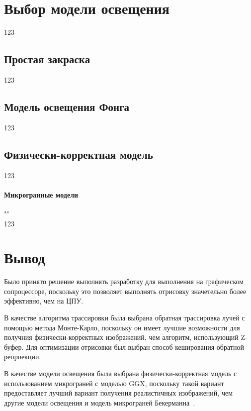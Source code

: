 \section{Выбор модели освещения}

123

\subsection{Простая закраска}
123~\cite{Rodzhers}

\subsection{Модель освещения Фонга}
123~\cite{IFCGP}

\subsection{Физически-корректная модель}
123~\cite{PBRT3e}

\paragraph{Микрогранные модели}""\\
123~\cite{PBRT3e}~\cite{MMfRtRS}

\section{Вывод}

Было принято решение выполнять разработку для выполнения на графическом сопроцессоре,
поскольку это позволяет выполнять отрисовку значетельно более эффективно, чем на ЦПУ.

В качестве алгоритма трассировки была выбрана обратная трассировка лучей с помощью
метода Монте-Карло, поскольку он имеет
лучшие возможности для получния физически-корректных изображений, чем 
алгоритм, использующий Z-буфер.
Для оптимизации отрисовки был выбран способ кеширования 
обратной репроекции.

В качестве модели освещения была выбрана физически-корректная модель с использованием
микрограней с моделью GGX, поскольку такой вариант предоставляет лучший вариант
получения реалистичных изображений, чем другие модели освещения и модель микрограней Бекерманна~\cite{MMfRtRS}.
